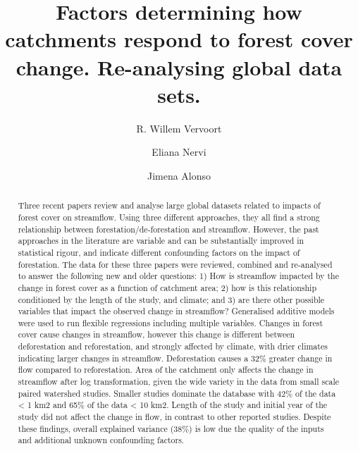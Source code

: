 \documentclass[]{elsarticle} %
\begin{document}
\begin{frontmatter}

  \title{Factors determining how catchments respond to forest cover change. Re-analysing global data sets.}
    \author[DARE, The University of Sydney]{R. Willem Vervoort}
    \author[INIA]{Eliana Nervi}
    \author[IMFIA]{Jimena Alonso}
      \address[DARE]{ARC Training Centre Data Analytics for Resources and the Environment}
    \address[The University of Sydney]{School of Life and Environmental Sciences, The University of Sydney, Sydney, NSW 2006, Australia}
    \address[INIA]{Project Manager, FPTA 357, Instituto Nacional de Investigación Agropecuaria, INIA-Uruguay, Ruta 48 km 10, Rincon del Colorado, 90100 Canelones, Uruguay}
    \address[IMFIA]{Institute of Fluid Mechanics and Environmental Engineering, School of Engineering, Universidad de la República, 11200 Montevideo, Uruguay}
  
  \begin{abstract}
  Three recent papers review and analyse large global datasets related to impacts of forest cover on streamflow. Using three different approaches, they all find a strong relationship between forestation/de-forestation and streamflow. However, the past approaches in the literature are variable and can be substantially improved in statistical rigour, and indicate different confounding factors on the impact of forestation. The data for these three papers were reviewed, combined and re-analysed to answer the following new and older questions: 1) How is streamflow impacted by the change in forest cover as a function of catchment area; 2) how is this relationship conditioned by the length of the study, and climate; and 3) are there other possible variables that impact the observed change in streamflow? Generalised additive models were used to run flexible regressions including multiple variables.
  Changes in forest cover cause changes in streamflow, however this change is different between deforestation and reforestation, and strongly affected by climate, with drier climates indicating larger changes in streamflow. Deforestation causes a 32\% greater change in flow compared to reforestation. Area of the catchment only affects the change in streamflow after log transformation, given the wide variety in the data from small scale paired watershed studies. Smaller studies dominate the database with 42\% of the data \textless{} 1 km2 and 65\% of the data \textless{} 10 km2. Length of the study and initial year of the study did not affect the change in flow, in contrast to other reported studies. Despite these findings, overall explained variance (38\%) is low due the quality of the inputs and additional unknown confounding factors.
  \end{abstract}
  
 \end{frontmatter}
\end{document}
